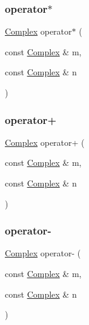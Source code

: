 \subsubsection{\texorpdfstring{operator$\ast$}{operator*}}
{\footnotesize\ttfamily \mbox{\hyperlink{classComplex}{Complex}} operator$\ast$ (\begin{DoxyParamCaption}\item[{const \mbox{\hyperlink{classComplex}{Complex}} \&}]{m,  }\item[{const \mbox{\hyperlink{classComplex}{Complex}} \&}]{n }\end{DoxyParamCaption})\hspace{0.3cm}{\ttfamily [friend]}}

\mbox{\label{classComplex_a47f36e8ddc742de052086d653d7b8e04}} 
\subsubsection{\texorpdfstring{operator+}{operator+}}
{\footnotesize\ttfamily \mbox{\hyperlink{classComplex}{Complex}} operator+ (\begin{DoxyParamCaption}\item[{const \mbox{\hyperlink{classComplex}{Complex}} \&}]{m,  }\item[{const \mbox{\hyperlink{classComplex}{Complex}} \&}]{n }\end{DoxyParamCaption})\hspace{0.3cm}{\ttfamily [friend]}}

\mbox{\label{classComplex_ab2328f9c33b801e1ab56ee119493440f}} 
\subsubsection{\texorpdfstring{operator-\/}{operator-}}
{\footnotesize\ttfamily \mbox{\hyperlink{classComplex}{Complex}} operator-\/ (\begin{DoxyParamCaption}\item[{const \mbox{\hyperlink{classComplex}{Complex}} \&}]{m,  }\item[{const \mbox{\hyperlink{classComplex}{Complex}} \&}]{n }\end{DoxyParamCaption})\hspace{0.3cm}{\ttfamily [friend]}}

